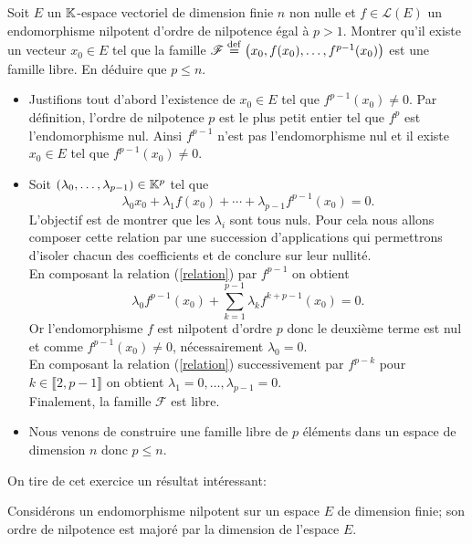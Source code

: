 \begin{exercice}
    Soit $E$ un $\mathbb{K}$-espace vectoriel de dimension finie $n$ non nulle et $f \in \mathscr{L}(E)$ un endomorphisme nilpotent d'ordre de nilpotence égal à $p > 1$. Montrer qu'il existe un vecteur $x_0 \in E$ tel que la famille $\mathscr{F} \overset{\mathrm{\tiny def}}{=} \big(x_0, f(x_0), \dots, f^{p-1}(x_0) \big)$ est une famille libre. En déduire que $p \leqslant n$. 
\end{exercice}    

\begin{solution}
    \begin{itemize}
        \item Justifions tout d'abord l'existence de $x_0 \in E$ tel que $f^{p-1}(x_0) \not= 0$. Par définition, l'ordre de nilpotence $p$ est le plus petit entier tel que $f^p$ est l'endomorphisme nul. Ainsi $f^{p-1}$ n'est pas l'endomorphisme nul et il existe $x_0 \in E$ tel que $f^{p-1}(x_0) \not= 0$.
        \item Soit $(\lambda_0, \dots, \lambda_{p-1}) \in \mathbb{K}^p$ tel que 
        \begin{equation}\tag{$\star$} \label{relation}
            \lambda_0 x_0 + \lambda_1 f(x_0) + \cdots + \lambda_{p-1} f^{p-1}(x_0) = 0.
        \end{equation}
        L'objectif est de montrer que les $\lambda_i$ sont tous nuls. Pour cela nous allons composer cette relation par une succession d'applications qui permettrons d'isoler chacun des coefficients et de conclure sur leur nullité. \\
        En composant la relation (\ref{relation}) par $f^{p-1}$ on obtient
        $$\lambda_0 f^{p-1}(x_0) + \sum_{k=1}^{p-1} \lambda_k f^{k + p-1}(x_0) = 0.$$
        Or l'endomorphisme $f$ est nilpotent d'ordre $p$ donc le deuxième terme est nul et comme $f^{p-1}(x_0) \not= 0$, nécessairement $\lambda_0 = 0$. \\
        En composant la relation (\ref{relation}) successivement par $f^{p - k}$ pour $k \in \llbracket 2, p-1 \rrbracket$ on obtient $\lambda_1 = 0, \dots, \lambda_{p-1} = 0$. \\
        Finalement, la famille $\mathscr{F}$ est libre.
        \item Nous venons de construire une famille libre de $p$ éléments dans un espace de dimension $n$ donc $p \leqslant n$. 
    \end{itemize}
\end{solution}
On tire de cet exercice un résultat intéressant:
\begin{prop}
    Considérons un endomorphisme nilpotent sur un espace $E$ de dimension finie; son ordre de nilpotence est majoré par la dimension de l'espace $E$.
\end{prop}
